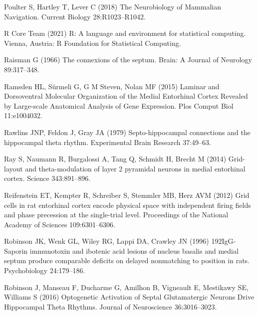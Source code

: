 \documentclass[
  12pt,
  a4paper,
  openany]{book}
\newlength{\cslhangindent}
\newlength{\cslentryspacingunit} %
\newenvironment{CSLReferences}[2] %
 {%
  \setlength{\parindent}{0pt}
  \ifodd #1
  \let\oldpar\par
  \def\par{\hangindent=\cslhangindent\oldpar}
  \fi
  \setlength{\parskip}{#2\cslentryspacingunit}
 }%
 {}
\begin{document}
\begin{CSLReferences}{1}{0}
\leavevmode{}%
Poulter S, Hartley T, Lever C (2018) The {Neurobiology} of {Mammalian} {Navigation}. Current Biology 28:R1023--R1042.

\leavevmode{}%
R Core Team (2021) R: A language and environment for statistical computing. Vienna, Austria: R Foundation for Statistical Computing.

\leavevmode{}%
Raisman G (1966) The connexions of the septum. Brain: A Journal of Neurology 89:317--348.

\leavevmode{}%
Ramsden HL, Sürmeli G, G M Steven, Nolan MF (2015) Laminar and {Dorsoventral} {Molecular} {Organization} of the {Medial} {Entorhinal} {Cortex} {Revealed} by {Large}-scale {Anatomical} {Analysis} of {Gene} {Expression}. Plos Comput Biol 11:e1004032.

\leavevmode{}%
Rawlins JNP, Feldon J, Gray JA (1979) Septo-hippocampal connections and the hippocampal theta rhythm. Experimental Brain Research 37:49--63.

\leavevmode{}%
Ray S, Naumann R, Burgalossi A, Tang Q, Schmidt H, Brecht M (2014) Grid-layout and theta-modulation of layer 2 pyramidal neurons in medial entorhinal cortex. Science 343:891--896.

\leavevmode{}%
Reifenstein ET, Kempter R, Schreiber S, Stemmler MB, Herz AVM (2012) Grid cells in rat entorhinal cortex encode physical space with independent firing fields and phase precession at the single-trial level. Proceedings of the National Academy of Sciences 109:6301--6306.

\leavevmode{}%
Robinson JK, Wenk GL, Wiley RG, Lappi DA, Crawley JN (1996) {192IgG}-{Saporin} immunotoxin and ibotenic acid lesions of nucleus basalis and medial septum produce comparable deficits on delayed nonmatching to position in rats. Psychobiology 24:179--186.

\leavevmode{}%
Robinson J, Manseau F, Ducharme G, Amilhon B, Vigneault E, Mestikawy SE, Williams S (2016) Optogenetic {Activation} of {Septal} {Glutamatergic} {Neurons} {Drive} {Hippocampal} {Theta} {Rhythms}. Journal of Neuroscience 36:3016--3023.


\end{CSLReferences}
\end{document}

